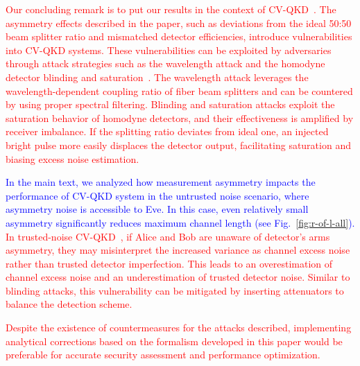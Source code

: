 \documentclass[%
reprint,
superscriptaddress,
 amsmath,amssymb,amsfonts,
 aps,
 pra,
 longbibliography
]{revtex4-2}
\begin{document}
\textcolor{red}{Our concluding remark is to put our results in the context of CV-QKD~\cite{zhang2024continuous}. 
The asymmetry effects described in the paper, such as deviations from the ideal 50:50 beam splitter ratio and mismatched detector efficiencies, introduce vulnerabilities into CV-QKD systems. %
These vulnerabilities can be exploited by adversaries through attack strategies such as the wavelength attack \cite{huang2012wavelength, huang2014quantum} and the homodyne detector blinding \cite{qin2018homodyne} and saturation~\cite{qin2016quantum}. The wavelength attack leverages the wavelength-dependent coupling ratio of fiber beam splitters and can be countered by using proper spectral filtering. Blinding and saturation attacks exploit the saturation behavior of homodyne detectors, and their effectiveness is amplified by receiver imbalance. If the splitting ratio deviates from ideal one, an injected bright pulse more easily displaces the detector output, facilitating saturation and biasing excess noise estimation.} 

\textcolor{blue}{In the main text, we analyzed how measurement asymmetry impacts the performance of CV-QKD system in the untrusted noise scenario, where asymmetry noise is accessible to Eve. In this case, even relatively small asymmetry significantly reduces maximum channel length (see Fig.~\ref{fig:r-of-l-all}).} \textcolor{red}{In trusted-noise CV-QKD~\cite{usenko2016trusted}, if Alice and Bob are unaware of detector’s arms asymmetry, they may misinterpret the increased variance as channel excess noise rather than trusted detector imperfection. This leads to an overestimation of channel excess noise and an underestimation of trusted detector noise. Similar to blinding attacks, this vulnerability can be mitigated by inserting attenuators to balance the detection scheme.}

\textcolor{red}{Despite the existence of countermeasures for the attacks described, implementing analytical corrections based on the formalism developed in this paper would be preferable for accurate security assessment and performance optimization.}

\end{document}
